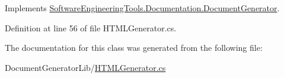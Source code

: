 Implements \hyperlink{class_software_engineering_tools_1_1_documentation_1_1_document_generator_af39f74148f77d9e036a9a3b284c4d569}{Software\+Engineering\+Tools.\+Documentation.\+Document\+Generator}.



Definition at line 56 of file H\+T\+M\+L\+Generator.\+cs.



The documentation for this class was generated from the following file\+:\begin{DoxyCompactItemize}
\item 
Document\+Generator\+Lib/\hyperlink{_h_t_m_l_generator_8cs}{H\+T\+M\+L\+Generator.\+cs}\end{DoxyCompactItemize}
